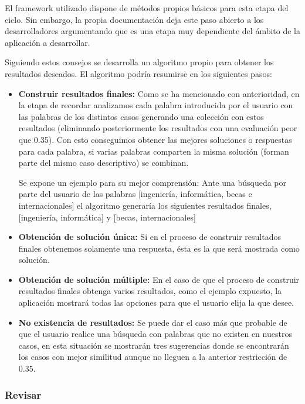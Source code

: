 El framework utilizado dispone de métodos propios básicos para esta etapa del ciclo. Sin embargo, la propia documentación deja este paso abierto a los desarrolladores argumentando que es una etapa muy dependiente del ámbito de la aplicación a desarrollar.

Siguiendo estos consejos se desarrolla un algoritmo propio para obtener los resultados deseados. El algoritmo podría resumirse en los siguientes pasos:

\begin{itemize}
\tightlist
\item
  \textbf{Construir resultados finales:} Como se ha mencionado con anterioridad, en la etapa de recordar analizamos cada palabra introducida por el usuario con las palabras de los distintos casos generando una colección con estos resultados (eliminando posteriormente los resultados con una evaluación peor que 0.35). Con esto conseguimos obtener las mejores soluciones o respuestas para cada palabra, si varias palabras comparten la misma solución (forman parte del mismo caso descriptivo) se combinan.
  
  Se expone un ejemplo para su mejor comprensión:
  Ante una búsqueda por parte del usuario de las palabras 
  [ingeniería, informática, becas e internacionales] 
  el algoritmo generaría los siguientes resultados finales, 
  [ingeniería, informática]  y 
  [becas, internacionales] 
\item
  \textbf{Obtención de solución única:} Si en el proceso de construir resultados finales obtenemos solamente una respuesta, ésta es la que será mostrada como solución.
  \item
  \textbf{Obtención de solución múltiple:} En el caso de que el proceso de construir resultados finales obtenga varios resultados, como el ejemplo expuesto, la aplicación mostrará todas las opciones para que el usuario elija la que desee.
    \item
  \textbf{No existencia de resultados:} Se puede dar el caso más que probable de que el usuario realice una búsqueda con palabras que no existen en nuestros casos, en esta situación se mostrarán tres sugerencias donde se encontrarán los casos con mejor similitud aunque no lleguen a la anterior restricción de 0.35.
\end{itemize}

\subsubsection{Revisar}\label{Revisar}

